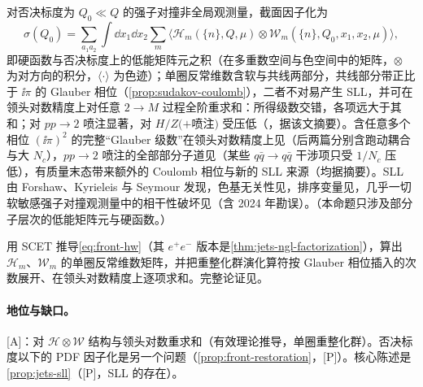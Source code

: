 \begin{proposition}\label{prop:front-sll-all-orders}
对否决标度为 $Q_0\ll Q$ 的强子对撞非全局观测量，截面因子化为
\begin{equation}\label{eq:front-hw}
\sigma(Q_0)=\sum_{a_1a_2}\int\dd x_1\dd x_2\sum_m\bigl\langle\mathcal H_m(\{n\},Q,\mu)\otimes\mathcal W_m(\{n\},Q_0,x_1,x_2,\mu)\bigr\rangle ,
\end{equation}
即硬函数与否决标度上的低能矩阵元之积（在多重数空间与色空间中的矩阵，$\otimes$ 为对方向的积分，$\langle\cdot\rangle$ 为色迹）；单圈反常维数含软与共线两部分，共线部分带正比于 $\ii\pi$ 的 Glauber 相位（\cref{prop:sudakov-coulomb}），二者不对易产生 SLL，并可在领头对数精度上对任意 $2\to M$ 过程全阶重求和：所得级数交错，各项远大于其和；对 $pp\to2$ 喷注显著，对 $H/Z(+$喷注$)$ 受压低（\cite{Becher:2023mtx}，据该文摘要）。含任意多个相位 $(\ii\pi)^2$ 的完整“Glauber 级数”在领头对数精度上见\cite{Boer:2023jsy,Boer:2023ljq,Boer:2024hzh,Boer:2024xzy}（后两篇分别含跑动耦合与大 $N_c$），$pp\to2$ 喷注的全部部分子道见\cite{Becher:2024nqc}（某些 $q\bar q\to q\bar q$ 干涉项只受 $1/N_c$ 压低），有质量末态带来额外的 Coulomb 相位与新的 SLL 来源\cite{Banerjee:2025kkq}（均据摘要）。SLL 由 Forshaw、Kyrieleis 与 Seymour 发现\cite{ForshawKyrieleisSeymour2006}，色基无关性见\cite{Forshaw:2008cq}，排序变量见\cite{Angeles-Martinez:2015rna}，几乎一切软敏感强子对撞观测量中的相干性破坏见\cite{Forshaw:2021fxs}（含 2024 年勘误）。（本命题只涉及部分子层次的低能矩阵元与硬函数。）
\end{proposition}

\begin{proofsketch}
用 SCET 推导\cref{eq:front-hw}（其 $e^+e^-$ 版本是\cref{thm:jets-ngl-factorization}），算出 $\mathcal H_m$、$\mathcal W_m$ 的单圈反常维数矩阵，并把重整化群演化算符按 Glauber 相位插入的次数展开、在领头对数精度上逐项求和。完整论证见\cite{Becher:2023mtx}。
\end{proofsketch}

\paragraph{地位与缺口。}[A]：对 $\mathcal H\otimes\mathcal W$ 结构与领头对数重求和（有效理论推导，单圈重整化群）。否决标度以下的 PDF 因子化是另一个问题（\cref{prop:front-restoration}，[P]）。核心陈述是\cref{prop:jets-sll}（[P]，SLL 的存在）。

